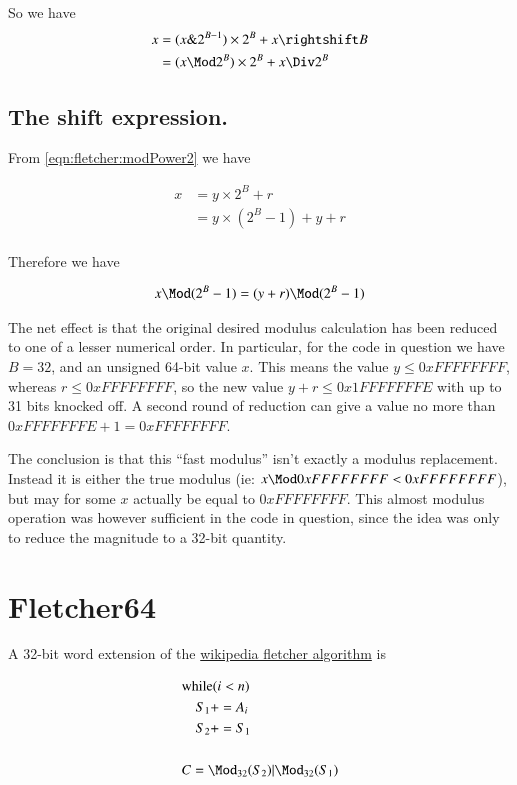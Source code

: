 So we have
\begin{align*}
x 
&= (x \& 2^{B-1}) \times 2^B + x \rightshift B \\
&= (x \Mod 2^B) \times 2^B + x \Div 2^B \\
\end{align*}

\subsection{The shift expression. }

From \ref{eqn:fletcher:modPower2} we have

\begin{align*}
x 
&= y \times 2^B + r \\
&= y \times (2^B -1) + y + r \\
\end{align*}

Therefore we have

\begin{align*}
x \Mod (2^B -1) &= (y + r) \Mod (2^B -1) \\
\end{align*}

The net effect is that the original desired modulus calculation has been reduced to one of a lesser numerical order.  In particular, for the
code in question we have $B=32$, and an unsigned 64-bit value $x$.  This means the value $y \le 0xFFFFFFFF$, whereas $r \le 0xFFFFFFFF$, so the new value
$y + r \le 0x1FFFFFFFE$ with up to 31 bits knocked off.  A second round of reduction can give a value no more than $0xFFFFFFFE + 1 = 0xFFFFFFFF$.

The conclusion is that this ``fast modulus'' isn't exactly a modulus replacement.  Instead it is either the true modulus (ie: $x \Mod 0xFFFFFFFF < 0xFFFFFFFF$), but may for some $x$ actually be equal to $0xFFFFFFFF$.  This almost modulus operation was however sufficient in the code in question, since the idea was only to reduce the magnitude to a 32-bit quantity.

\section{Fletcher64 }

A 32-bit word extension of the \href{http://en.wikipedia.org/wiki/Fletcher%27s_checksum}{wikipedia fletcher algorithm} is

\begin{align*}
&\text{while} ( i < n )  \\
&\quad   S_1 += A_i \\
&\quad   S_2 += S_1 \\
\\
&C = \Mod_{32}(S_2) | \Mod_{32}(S_1)
\end{align*}

